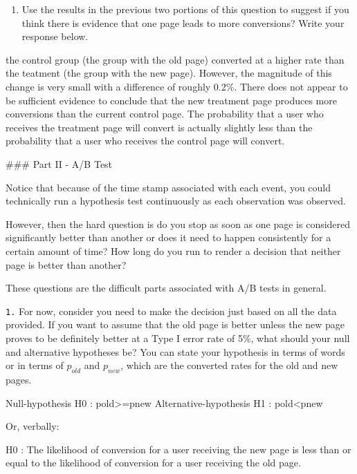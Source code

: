 \documentclass[11pt]{article}
\providecommand{\tightlist}{%
      \setlength{\itemsep}{0pt}\setlength{\parskip}{0pt}}
\begin{document}
    \begin{enumerate}
\def\labelenumi{\alph{enumi}.}
\setcounter{enumi}{4}
\tightlist
\item
  Use the results in the previous two portions of this question to
  suggest if you think there is evidence that one page leads to more
  conversions? Write your response below.
\end{enumerate}

    the control group (the group with the old page) converted at a higher
rate than the teatment (the group with the new page). However, the
magnitude of this change is very small with a difference of roughly
0.2\%. There does not appear to be sufficient evidence to conclude that
the new treatment page produces more conversions than the current
control page. The probability that a user who receives the treatment
page will convert is actually slightly less than the probability that a
user who receives the control page will convert.

     \#\#\# Part II - A/B Test

Notice that because of the time stamp associated with each event, you
could technically run a hypothesis test continuously as each observation
was observed.

However, then the hard question is do you stop as soon as one page is
considered significantly better than another or does it need to happen
consistently for a certain amount of time? How long do you run to render
a decision that neither page is better than another?

These questions are the difficult parts associated with A/B tests in
general.

\texttt{1.} For now, consider you need to make the decision just based
on all the data provided. If you want to assume that the old page is
better unless the new page proves to be definitely better at a Type I
error rate of 5\%, what should your null and alternative hypotheses be?
You can state your hypothesis in terms of words or in terms of
\textbf{\(p_{old}\)} and \textbf{\(p_{new}\)}, which are the converted
rates for the old and new pages.

    Null-hypothesis H0 : pold\textgreater{}=pnew Alternative-hypothesis H1 :
pold\textless{}pnew

Or, verbally:

H0 : The likelihood of conversion for a user receiving the new page is
less than or equal to the likelihood of conversion for a user receiving
the old page.
\end{document}
